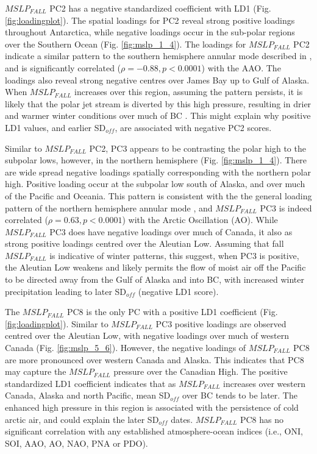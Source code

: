\documentclass{tATO2e}
\newcommand{\sdoff}{SD$_{off}$}
\begin{document}
$MSLP_{FALL}$ PC2 has a negative standardized coefficient with LD1 (Fig. \ref{fig:loadingplot}). The spatial loadings for PC2 reveal strong positive loadings throughout Antarctica, while negative loadings occur in the sub-polar regions over the Southern Ocean (Fig. \ref{fig:mslp_1_4}). The loadings for $MSLP_{FALL}$ PC2 indicate a similar pattern to the southern hemisphere annular mode described in \cite{Thompson2000}, and is significantly correlated ($\rho = -0.88, p < 0.0001$) with the AAO. The loadings also reveal strong negative centres over James Bay up to Gulf of Alaska. When $MSLP_{FALL}$ increases over this region, assuming the pattern persists, it is likely that the polar jet stream is diverted by this high pressure, resulting in drier and warmer winter conditions over much of BC \citep{Shabbar2006-ek}. This might explain why positive LD1 values, and earlier \sdoff{}, are associated with negative PC2 scores.
\par
Similar to $MSLP_{FALL}$ PC2, PC3 appears to be contrasting the polar high to the subpolar lows, however, in the northern hemisphere (Fig. \ref{fig:mslp_1_4}). There are wide spread negative loadings spatially corresponding with the northern polar high. Positive loading occur at the subpolar low south of Alaska, and over much of the Pacific and Oceania. This pattern is consistent with the the general loading pattern of the northern hemisphere annular mode \citep{Thompson2000}, and $MSLP_{FALL}$ PC3 is indeed correlated ($\rho = 0.63, p < 0.0001$) with the Arctic Oscillation (AO). While $MSLP_{FALL}$ PC3 does have negative loadings over much of Canada, it also as strong positive loadings centred over the Aleutian Low. Assuming that fall $MSLP_{FALL}$ is indicative of winter patterns, this suggest, when PC3 is positive, the Aleutian Low weakens and likely permits the flow of moist air off the Pacific to be directed away from the Gulf of Alaska and into BC, with increased winter precipitation leading to later \sdoff{} (negative LD1 score).   
\par
The $MSLP_{FALL}$ PC8 is the only PC with a positive LD1 coefficient (Fig. \ref{fig:loadingplot}). Similar to $MSLP_{FALL}$ PC3  positive loadings are observed centred over the Aleutian Low, with negative loadings over much of western Canada (Fig. \ref{fig:mslp_5_6}). However, the negative loadings of $MSLP_{FALL}$ PC8 are more pronounced over western Canada and Alaska. This indicates that PC8 may capture the $MSLP_{FALL}$ pressure over the Canadian High. The positive standardized LD1 coefficient indicates that as $MSLP_{FALL}$ increases over western Canada, Alaska and north Pacific, mean \sdoff{} over BC tends to be later. The enhanced high pressure in this region is associated with the persistence of cold arctic air, and could explain the later \sdoff{} dates. $MSLP_{FALL}$ PC8 has no significant correlation with any established atmosphere-ocean indices (i.e., ONI, SOI, AAO, AO, NAO, PNA or PDO). 
\end{document}
